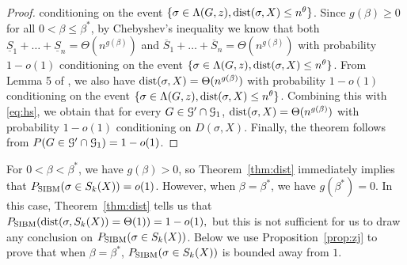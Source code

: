 \documentclass{article}
\begin{document}
\begin{proof}
	conditioning on the event $\{\sigma\in \Lambda(G,z) ,\operatorname{dist}(\sigma, X) \le n^{\theta}\}$. Since $g(\beta)\ge 0$ for all $0<\beta\le \beta^\ast$, by Chebyshev's inequality we know that both $\underline{S}_1 + \dots + \underline{S}_n=\Theta(n^{g(\beta)})$ and $\overline{S}_1 + \dots + \overline{S}_n=\Theta(n^{g(\beta)})$ with probability $1-o(1)$ conditioning on the event $\{\sigma\in \Lambda(G,z) ,\operatorname{dist}(\sigma, X) \le n^{\theta}\}$.
	From Lemma 5 of \cite{ye2020exact}, we also have $\operatorname{dist}(\sigma,X)=\Theta(n^{g(\beta)})$ with probability $1-o(1)$ conditioning on the event $\{\sigma\in \Lambda(G,z) ,\operatorname{dist}(\sigma, X) \le n^{\theta}\}$. Combining this with \eqref{eq:hs}, we obtain that for every $G\in\mathcal{G}'\cap\mathcal{G}_1$, $\operatorname{dist}(\sigma,X)=\Theta(n^{g(\beta)})$ with probability $1-o(1)$ conditioning on $D(\sigma, X)$. Finally, the theorem follows from $P(G\in\mathcal{G}'\cap\mathcal{G}_1)=1-o(1)$.
	
\end{proof}
For $0<\beta<\beta^\ast$, we have $g(\beta)>0$, so Theorem~\ref{thm:dist} immediately implies that $P_{\operatorname{SIBM}}(\sigma \in S_k(X))=o(1)$. However, when $\beta=\beta^\ast$, we have $g(\beta^\ast)=0$. In this case, Theorem~\ref{thm:dist} tells us that
$
P_{\operatorname{SIBM}}(\operatorname{dist}(\sigma, S_k(X)) = \Theta(1) ) = 1-o(1) ,
$
but this is not sufficient for us to draw any conclusion on $P_{\operatorname{SIBM}}(\sigma \in S_k(X))$.
Below we use Proposition~\ref{prop:zj} to prove that when $\beta=\beta^\ast$, $P_{\operatorname{SIBM}}(\sigma \in S_k(X))$ is bounded away from $1$.
\end{document}
